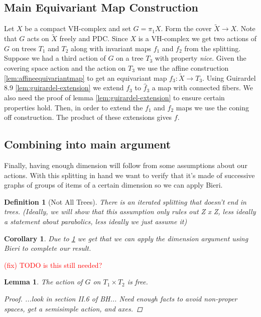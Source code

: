 \documentclass{article}
\newcommand{\fix}[1]{\textcolor{red}{(fix) #1}}
\theoremstyle{mystyle}
\newtheorem{lem}[thm]{Lemma}
\newtheorem{defn}[thm]{Definition}
\newtheorem*{cor*}{Corollary}
\theoremstyle{remark}
\begin{document}
\subsection{Main Equivariant Map Construction}
Let \(X\) be a compact VH-complex and set \(G= \pi_{1} X\). Form the cover \(\widetilde{X} \to X\). Note that \(G\) acts on \(\widetilde X\) freely and PDC. Since \(X\) is a VH-complex we get two actions of \(G\) on trees \(T_{1}\) and \(T_{2}\) along with invariant maps \(f_{1}\) and \(f_{2}\) from the splitting. Suppose we had a third action of \(G\) on a tree \(T_{3}\) with property {\em nice}. Given the covering space action and the action on \(T_{3}\) we use the affine construction \ref{lem:affineequivariantmap} to get an equivariant map \(f_{3} : \widetilde X \to T_{3}\). Using Guirardel 8.9 \ref{lem:guirardel-extension} we extend \(f_{3}\) to \(\widehat f_{3}\) a map with connected fibers. We also need the proof of lemma \ref{lem:guirardel-extension} to ensure certain properties hold. Then, in order to extend the \(f_{1}\) and \(f_{2}\) maps we use the coning off construction. The product of these extensions gives \(f\).
    
\subsection{Combining into main argument}

Finally, having enough dimension will follow from some assumptions about our actions.
With this splitting in hand we want to verify that it's made of successive graphs of groups of items of a certain dimension so we can apply Bieri.

\begin{defn}
    [Not All Trees]
    \label{def:notalltrees} 
    There is an iterated splitting that doesn't end in trees. (Ideally, we will show that this assumption only rules out Z x Z, less ideally a statement about parabolics, less ideally we just assume it)
\end{defn}

\begin{cor*}
    Due to \ref{def:notalltrees} we get that we can apply the dimension argument using Bieri to complete our result.
\end{cor*}

\fix{ TODO is this still needed?}
\begin{lem}
    The action of \(G\) on \(T_1 \times T_{2} \) is free.
    \begin{proof}
        ...look in section II.6 of BH... Need enough facts to avoid non-proper spaces, get a semisimple action, and axes.
    \end{proof}
\end{lem}
\end{document}
